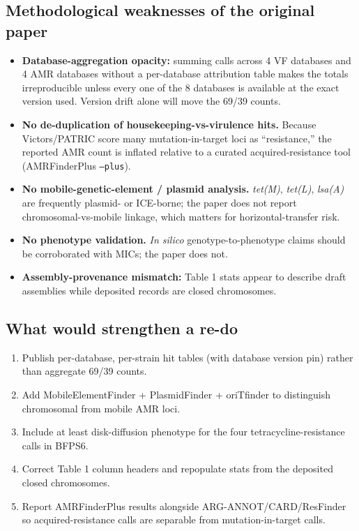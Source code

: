 \documentclass[11pt]{article}
\begin{document}
\subsection{Methodological weaknesses of the original paper}
\begin{itemize}
  \item \textbf{Database-aggregation opacity:} summing calls across 4 VF databases and 4 AMR databases without a per-database attribution table makes the totals irreproducible unless every one of the 8 databases is available at the exact version used. Version drift alone will move the 69/39 counts.
  \item \textbf{No de-duplication of housekeeping-vs-virulence hits.} Because Victors/PATRIC score many mutation-in-target loci as ``resistance,'' the reported AMR count is inflated relative to a curated acquired-resistance tool (AMRFinderPlus \texttt{--plus}).
  \item \textbf{No mobile-genetic-element / plasmid analysis.} \emph{tet(M)}, \emph{tet(L)}, \emph{lsa(A)} are frequently plasmid- or ICE-borne; the paper does not report chromosomal-vs-mobile linkage, which matters for horizontal-transfer risk.
  \item \textbf{No phenotype validation.} \emph{In silico} genotype-to-phenotype claims should be corroborated with MICs; the paper does not.
  \item \textbf{Assembly-provenance mismatch:} Table 1 stats appear to describe draft assemblies while deposited records are closed chromosomes.
\end{itemize}

\subsection{What would strengthen a re-do}
\begin{enumerate}
  \item Publish per-database, per-strain hit tables (with database version pin) rather than aggregate 69/39 counts.
  \item Add MobileElementFinder + PlasmidFinder + oriTfinder to distinguish chromosomal from mobile AMR loci.
  \item Include at least disk-diffusion phenotype for the four tetracycline-resistance calls in BFPS6.
  \item Correct Table 1 column headers and repopulate stats from the deposited closed chromosomes.
  \item Report AMRFinderPlus results alongside ARG-ANNOT/CARD/ResFinder so acquired-resistance calls are separable from mutation-in-target calls.
\end{enumerate}
\end{document}
